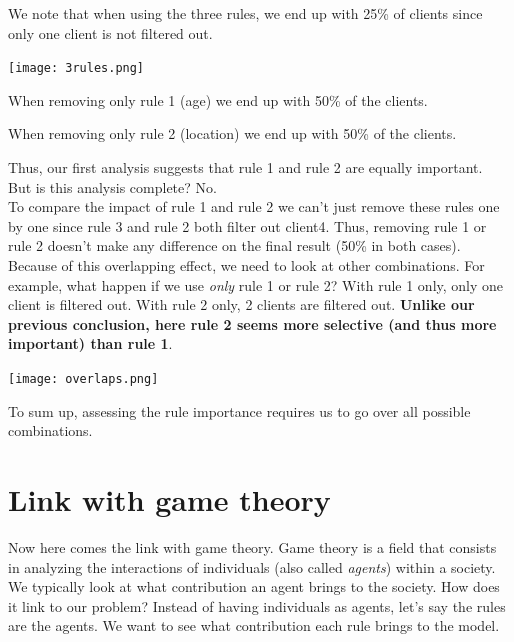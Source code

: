 We note that when using the three rules, we end up with 25\% of clients since only one client is not filtered out. 

\begin{center}
\texttt{[image: 3rules.png]}
\end{center}


When removing only rule 1 (age) we end up with 50\% of the clients. 

When removing only rule 2 (location) we end up with 50\% of the clients.

Thus, our first analysis suggests that rule 1 and rule 2 are equally important. \\

But is this analysis complete? No. \\

To compare the impact of rule 1  and rule 2 we can't just remove these rules one by one since rule 3 and rule 2 both filter out client4. Thus, removing rule 1 or rule 2 doesn't make any difference on the final result (50\% in both cases). Because of this overlapping  effect, we need to look at other combinations. For example, what happen if we use \textit{only} rule 1 or rule 2? With rule 1 only, only one client is filtered out. With rule 2 only, 2 clients are filtered out. \textbf{Unlike our previous conclusion, here rule 2 seems more selective (and thus more important) than rule 1}. \\

\begin{center}
\texttt{[image: overlaps.png]}
\end{center}

To sum up, assessing the rule importance requires us to go over all possible combinations. \\

\section{Link with game theory}

\label{sec:link-with-game-theory}

Now here comes the link with game theory. 
Game theory is a field that consists in analyzing the interactions of individuals (also called \textit{agents}) within a society. We typically look at what contribution an agent brings to the society. How does it link to our problem? Instead of having individuals as agents, let's say the rules are the agents. We want to see what contribution each rule brings to the model. \\

